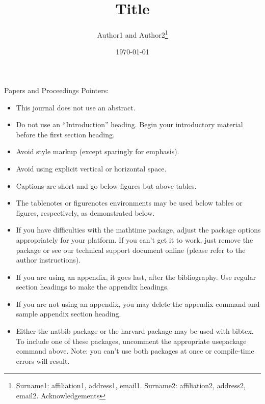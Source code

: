 \documentclass[PP]{AEA}
\begin{document}
\title{Title}
\author{Author1 and Author2\thanks{Surname1: affiliation1, address1, email1. 
Surname2: affiliation2, address2, email2. Acknowledgements}}
\date{\today}
\maketitle

Papers and Proceedings Pointers:

\begin{itemize}

\item This journal does not use an abstract. 

\item Do not use an ``Introduction'' heading. Begin your introductory material
before the first section heading.

\item Avoid style markup (except sparingly for emphasis).

\item Avoid using explicit vertical or horizontal space.

\item Captions are short and go below figures but above tables.

\item The tablenotes or figurenotes environments may be used below tables
or figures, respectively, as demonstrated below.

\item If you have difficulties with the mathtime package, adjust the package
options appropriately for your platform. If you can't get it to work, just
remove the package or see our technical support document online (please
refer to the author instructions).

\item If you are using an appendix, it goes last, after the bibliography.
Use regular section headings to make the appendix headings.

\item If you are not using an appendix, you may delete the appendix command
and sample appendix section heading.

\item Either the natbib package or the harvard package may be used with bibtex.
To include one of these packages, uncomment the appropriate usepackage command
above. Note: you can't use both packages at once or compile-time errors will result.

\end{itemize}
\end{document}
